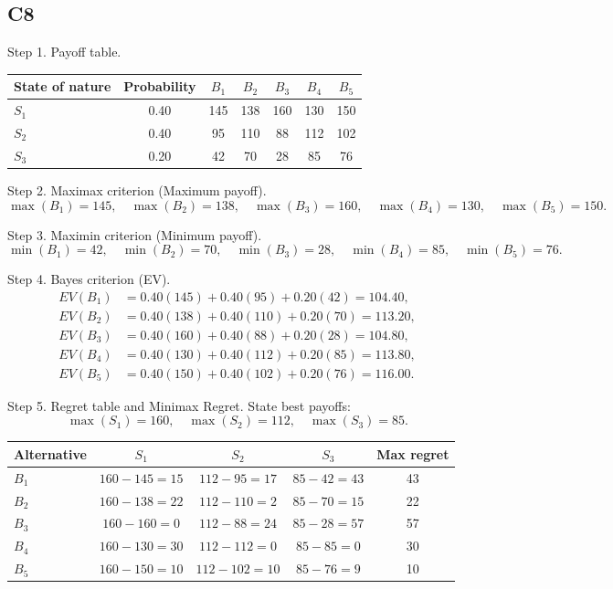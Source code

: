 \begin{ExamProblems}
		\subsection*{C8}
		Step 1. Payoff table.
		\begin{center}
			\begin{tabular}{l c c c c c c}
				\toprule
				State of nature & Probability & $B_1$ & $B_2$ & $B_3$ & $B_4$ & $B_5$ \\
				\midrule
				$S_1$ & 0.40 & 145 & 138 & 160 & 130 & 150 \\
				$S_2$ & 0.40 & 95 & 110 & 88 & 112 & 102 \\
				$S_3$ & 0.20 & 42 & 70 & 28 & 85 & 76 \\
				\bottomrule
			\end{tabular}
		\end{center}

		Step 2. Maximax criterion (Maximum payoff).
		\[
		\max(B_1)=145,\quad \max(B_2)=138,\quad \max(B_3)=160,\quad \max(B_4)=130,\quad \max(B_5)=150.
		\]

		Step 3. Maximin criterion (Minimum payoff).
		\[
		\min(B_1)=42,\quad \min(B_2)=70,\quad \min(B_3)=28,\quad \min(B_4)=85,\quad \min(B_5)=76.
		\]

		Step 4. Bayes criterion (EV).
		\[
		\begin{aligned}
		EV(B_1)&=0.40(145)+0.40(95)+0.20(42)=104.40,\\
		EV(B_2)&=0.40(138)+0.40(110)+0.20(70)=113.20,\\
		EV(B_3)&=0.40(160)+0.40(88)+0.20(28)=104.80,\\
		EV(B_4)&=0.40(130)+0.40(112)+0.20(85)=113.80,\\
		EV(B_5)&=0.40(150)+0.40(102)+0.20(76)=116.00.
		\end{aligned}
		\]

		Step 5. Regret table and Minimax Regret.
		State best payoffs:
		\[
		\max(S_1)=160,\quad \max(S_2)=112,\quad \max(S_3)=85.
		\]
		\begin{center}
			\begin{tabular}{l c c c c}
				\toprule
				Alternative & $S_1$ & $S_2$ & $S_3$ & Max regret \\
				\midrule
				$B_1$ & $160-145=15$ & $112-95=17$ & $85-42=43$ & 43 \\
				$B_2$ & $160-138=22$ & $112-110=2$ & $85-70=15$ & 22 \\
				$B_3$ & $160-160=0$ & $112-88=24$ & $85-28=57$ & 57 \\
				$B_4$ & $160-130=30$ & $112-112=0$ & $85-85=0$ & 30 \\
				$B_5$ & $160-150=10$ & $112-102=10$ & $85-76=9$ & 10 \\
				\bottomrule
			\end{tabular}
		\end{center}


\end{ExamProblems}
